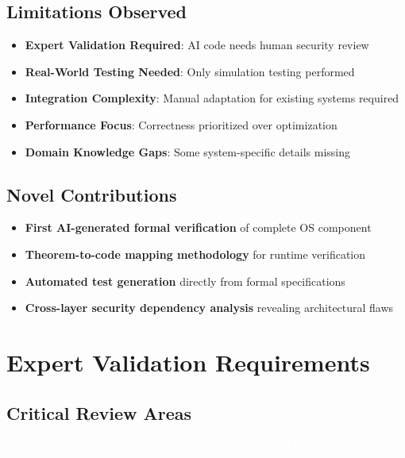 \documentclass[11pt,a4paper]{article}
\begin{document}
\subsection{Limitations Observed}

\begin{itemize}
    \item \textbf{Expert Validation Required}: AI code needs human security review
    \item \textbf{Real-World Testing Needed}: Only simulation testing performed
    \item \textbf{Integration Complexity}: Manual adaptation for existing systems required
    \item \textbf{Performance Focus}: Correctness prioritized over optimization
    \item \textbf{Domain Knowledge Gaps}: Some system-specific details missing
\end{itemize}

\subsection{Novel Contributions}

\begin{itemize}
    \item \textbf{First AI-generated formal verification} of complete OS component
    \item \textbf{Theorem-to-code mapping methodology} for runtime verification
    \item \textbf{Automated test generation} directly from formal specifications
    \item \textbf{Cross-layer security dependency analysis} revealing architectural flaws
\end{itemize}

\section{Expert Validation Requirements}

\subsection{Critical Review Areas}

\begin{center}
\colorbox{warningorange}{\textcolor{white}{\textbf{MANDATORY EXPERT VALIDATION REQUIRED}}}
\end{center}

\vspace{0.5cm}
\end{document}

